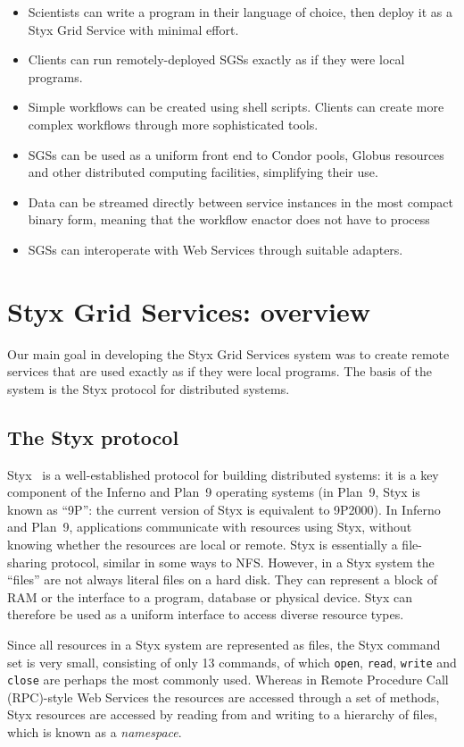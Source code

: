 \documentclass[a4paper]{article}
\begin{document}
\begin{itemize}
\item Scientists can write a program in their language of choice, then deploy it as a Styx Grid Service with minimal effort.
\item Clients can run remotely-deployed SGSs exactly as if they were local programs.
\item Simple workflows can be created using shell scripts.  Clients can create more complex workflows through more sophisticated tools.
\item SGSs can be used as a uniform front end to Condor pools, Globus resources and other distributed computing facilities, simplifying their use.
\item Data can be streamed directly between service instances in the most compact binary form, meaning that the workflow enactor does not have to process 
\item SGSs can interoperate with Web Services through suitable adapters.
\end{itemize}

\section{Styx Grid Services: overview}\label{sec:sgsoverview}
Our main goal in developing the Styx Grid Services system was to create remote services that are used exactly as if they were local programs.  The basis of the system is the Styx protocol for distributed systems.  

\subsection{The Styx protocol}
Styx~\cite{Pike:1999} is a well-established protocol for building distributed systems: it is a key component of the Inferno \cite{Inferno} and Plan~9 \cite{Plan9} operating systems (in Plan~9, Styx is known as ``9P'': the current version of Styx is equivalent to 9P2000).  In Inferno and Plan~9, applications communicate with resources using Styx, without knowing whether the resources are local or remote.  Styx is essentially a file-sharing protocol, similar in some ways to NFS.  However, in a Styx system the ``files'' are not always literal files on a hard disk.  They can represent a block of RAM or the interface to a program, database or physical device.  Styx can therefore be used as a uniform interface to access diverse resource types.

Since all resources in a Styx system are represented as files, the Styx command set is very small, consisting of only 13 commands, of which \texttt{open}, \texttt{read}, \texttt{write} and \texttt{close} are perhaps the most commonly used.  Whereas in Remote Procedure Call (RPC)-style Web Services the resources are accessed through a set of methods, Styx resources are accessed by reading from and writing to a hierarchy of files, which is known as a \textit{namespace\/}.
\end{document}
